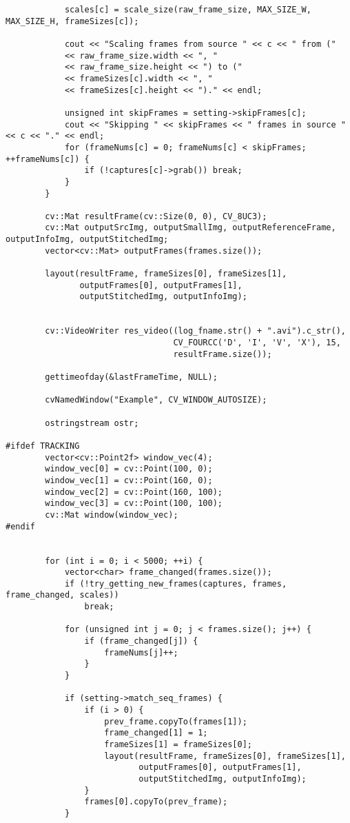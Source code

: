 \begin{lstlisting}
            scales[c] = scale_size(raw_frame_size, MAX_SIZE_W, MAX_SIZE_H, frameSizes[c]);
            
            cout << "Scaling frames from source " << c << " from ("
            << raw_frame_size.width << ", " 
            << raw_frame_size.height << ") to ("
            << frameSizes[c].width << ", "
            << frameSizes[c].height << ")." << endl;
            
            unsigned int skipFrames = setting->skipFrames[c];
            cout << "Skipping " << skipFrames << " frames in source " << c << "." << endl;
            for (frameNums[c] = 0; frameNums[c] < skipFrames; ++frameNums[c]) {
                if (!captures[c]->grab()) break;
            }            
        }		
		
		cv::Mat resultFrame(cv::Size(0, 0), CV_8UC3);		
		cv::Mat outputSrcImg, outputSmallImg, outputReferenceFrame, outputInfoImg, outputStitchedImg;
        vector<cv::Mat> outputFrames(frames.size());
		
        layout(resultFrame, frameSizes[0], frameSizes[1],
			   outputFrames[0], outputFrames[1],                
               outputStitchedImg, outputInfoImg);
		
        
        cv::VideoWriter res_video((log_fname.str() + ".avi").c_str(), 
                                  CV_FOURCC('D', 'I', 'V', 'X'), 15, 
                                  resultFrame.size());
        
		gettimeofday(&lastFrameTime, NULL);
		
		cvNamedWindow("Example", CV_WINDOW_AUTOSIZE);
        
        ostringstream ostr;
        	
#ifdef TRACKING
        vector<cv::Point2f> window_vec(4);
        window_vec[0] = cv::Point(100, 0);
        window_vec[1] = cv::Point(160, 0);
        window_vec[2] = cv::Point(160, 100);
        window_vec[3] = cv::Point(100, 100);
        cv::Mat window(window_vec);
#endif
        
        
		for (int i = 0; i < 5000; ++i) {
            vector<char> frame_changed(frames.size());
            if (!try_getting_new_frames(captures, frames, frame_changed, scales))
                break;
            
            for (unsigned int j = 0; j < frames.size(); j++) {
                if (frame_changed[j]) {
                    frameNums[j]++;
                }
            }
            
            if (setting->match_seq_frames) {    
                if (i > 0) {
                    prev_frame.copyTo(frames[1]);
                    frame_changed[1] = 1;
                    frameSizes[1] = frameSizes[0];
                    layout(resultFrame, frameSizes[0], frameSizes[1],
                           outputFrames[0], outputFrames[1],                
                           outputStitchedImg, outputInfoImg);
                }
                frames[0].copyTo(prev_frame);
            }
            

\end{lstlisting}
